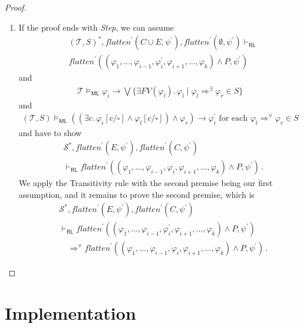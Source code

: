 \documentclass{article}
\newcommand{\RL}{\mathsf{RL}}
\newcommand{\ML}{\mathsf{ML}}
\begin{document}
\begin{proof}
\begin{enumerate}
    \item If the proof ends with \emph{Step},
      we can assume
      \begin{align*}
          & (\mathcal{T}, S)^*, \mathit{flatten}^\prime(C \cup E, \psi^\prime), \mathit{flatten}^\prime(\emptyset, \psi^\prime) \vdash_\RL
          \\&
          \mathit{flatten}^\prime((\varphi_1, \ldots, \varphi_{i-1}, \varphi_i^\prime, \varphi_{i+1}, \ldots,                          \varphi_k) \land P, \psi^\prime)
      \end{align*}
      and
      \begin{align*}
        \mathcal{T} \vDash_{\ML} \varphi_i \rightarrow \bigvee \{ \exists \mathit{FV}(\varphi_l).\, \varphi_l \mid \varphi_l \Rightarrow^\exists \varphi_r \in S \}   
      \end{align*}
      and
      \begin{align}
        (\mathcal{T}, S) \vDash_\ML ((\exists c.\, \varphi_i[c/\square] \land \varphi_l[c/\square]) \land \varphi_r) \rightarrow \varphi_i^\prime  \mbox{ for each } \varphi_l \Rightarrow^\forall \varphi_r \in S    
      \end{align}
      and have to show
    \begin{align*}
        & \mathcal{S}^*, \mathit{flatten}^\prime(E, \psi^\prime), \mathit{flatten}^\prime(C, \psi^\prime)
        \\& \vdash_\RL
          \mathit{flatten}^\prime((\varphi_1, \ldots, \varphi_{i-1}, \varphi_i, \varphi_{i+1}, \ldots, \varphi_k) \land P, \psi^\prime)  \, .
    \end{align*}
    We apply the Transitivity rule with the second premise being our first assumption, and it remains to prove the second premise, which is
    \begin{align*}
        & \mathcal{S}^*, \mathit{flatten}^\prime(E, \psi^\prime), \mathit{flatten}^\prime(C, \psi^\prime)
        \\& \vdash_\RL
        \mathit{flatten}^\prime((\varphi_1, \ldots, \varphi_{i-1}, \varphi_i^\prime, \varphi_{i+1}, \ldots,                          \varphi_k) \land P, \psi^\prime)
        \\&\quad \Rightarrow^\forall
        \mathit{flatten}^\prime((\varphi_1, \ldots, \varphi_{i-1}, \varphi_i, \varphi_{i+1}, \ldots, \varphi_k) \land P, \psi^\prime) \, .
    \end{align*}
\end{enumerate}
\end{proof}

\section{Implementation}




\appendix
\end{document}
